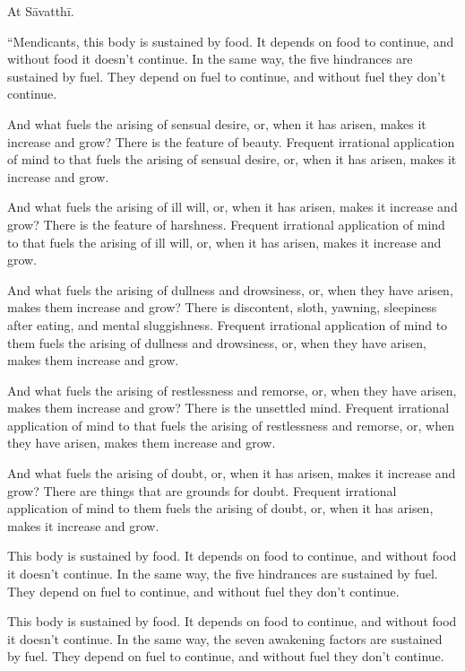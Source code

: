 \documentclass[12pt,openany]{book}%
\begin{document}
At \textsanskrit{Sāvatthī}. 

“Mendicants, this body is sustained by food. It depends on food to continue, and without food it doesn’t continue. In the same way, the five hindrances are sustained by fuel. They depend on fuel to continue, and without fuel they don’t continue. 

And what fuels the arising of sensual desire, or, when it has arisen, makes it increase and grow? There is the feature of beauty. Frequent irrational application of mind to that fuels the arising of sensual desire, or, when it has arisen, makes it increase and grow. 

And what fuels the arising of ill will, or, when it has arisen, makes it increase and grow? There is the feature of harshness. Frequent irrational application of mind to that fuels the arising of ill will, or, when it has arisen, makes it increase and grow. 

And what fuels the arising of dullness and drowsiness, or, when they have arisen, makes them increase and grow? There is discontent, sloth, yawning, sleepiness after eating, and mental sluggishness. Frequent irrational application of mind to them fuels the arising of dullness and drowsiness, or, when they have arisen, makes them increase and grow. 

And what fuels the arising of restlessness and remorse, or, when they have arisen, makes them increase and grow? There is the unsettled mind. Frequent irrational application of mind to that fuels the arising of restlessness and remorse, or, when they have arisen, makes them increase and grow. 

And what fuels the arising of doubt, or, when it has arisen, makes it increase and grow? There are things that are grounds for doubt. Frequent irrational application of mind to them fuels the arising of doubt, or, when it has arisen, makes it increase and grow. 

This body is sustained by food. It depends on food to continue, and without food it doesn’t continue. In the same way, the five hindrances are sustained by fuel. They depend on fuel to continue, and without fuel they don’t continue. 

This body is sustained by food. It depends on food to continue, and without food it doesn’t continue. In the same way, the seven awakening factors are sustained by fuel. They depend on fuel to continue, and without fuel they don’t continue. 
\end{document}
